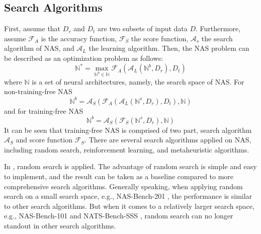 \documentclass[sigconf]{acmart}
\begin{document}
    \subsection{Search Algorithms}
    First, assume that $D_r$ and $D_t$ are two subsets of input data $D$. Furthermore, 
    assume $\mathcal F_A$ is the accuracy function, $\mathcal F_S$ the score function, $\mathcal A_s$ the 
    search algorithm of NAS, and $\mathcal A_L$ the learning algorithm. Then, the NAS problem can be 
    described as an optimization problem as follows: 
    \begin{equation}
        \label{equ:nas}
        \mathbb N^*=\max_{\mathbb N^b\in\mathbb N}\mathcal F_A(\mathcal A_L(\mathbb N^b, D_r), D_t)
    \end{equation}
    where $\mathbb N$ is a set of neural architectures, namely, the search space of NAS. 
    For non-training-free NAS 
    \begin{equation}
        \label{equ:non-training_free_nas}
        \mathbb N^b=\mathcal A_S(\mathcal F_A(\mathcal A_L(\mathbb N^s, D_r), D_t), \mathbb N)
    \end{equation}
    and for training-free NAS 
    \begin{equation}
        \label{equ:training_free_nas}
        \mathbb N^b=\mathcal A_S(\mathcal F_S(\mathbb N^s, D_r), \mathbb N)
    \end{equation}
    It can be seen that training-free NAS is comprised of two part, search algorithm $\mathcal A_S$ and score 
    function $\mathcal F_S$. 
    There are several search algorithms applied on NAS, including random search, reinforcement learning, and
    metaheuristic algorithms. 
    
    In \cite{https://doi.org/10.48550/arxiv.2006.04647} \cite{Lopes_2021}, random search is applied. 
    The advantage of random search is simple and easy to implement, and the result can be taken as a 
    baseline compared to more comprehensive search algorithms. Generally speaking, when applying random 
    search on a small search space, e.g., NAS-Bench-201 \cite{dong2020nasbench201}, the performance is 
    similar to other search algorithms. But when it comes to a relatively larger search space, e.g., NAS-Bench-101 
    \cite{ying2019nasbench101} and NATS-Bench-SSS \cite{Dong_2021}, random search can no longer standout 
    in other search algorithms. 
\end{document}
